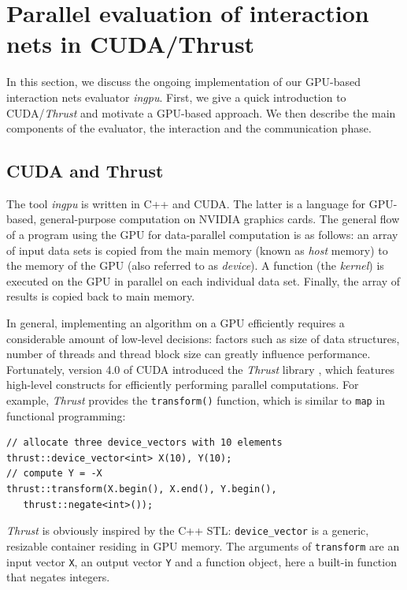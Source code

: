 \documentclass[submission,copyright,creativecommons]{eptcs}
\begin{document}

\section{Parallel evaluation of interaction nets in CUDA/Thrust}
\label{sec:parallel-evaluation-with-cuda}

In this section, we discuss the ongoing implementation of our GPU-based
interaction nets evaluator \emph{ingpu}. First, we give a quick introduction to
CUDA/\emph{Thrust} and motivate a GPU-based approach. We then describe the main
components of the evaluator, the interaction and the communication phase.

\subsection{CUDA and Thrust}
The tool \emph{ingpu} is written in C++ and CUDA. The latter is a language for
GPU-based, general-purpose
computation on NVIDIA graphics cards.
The general flow of a program using the
GPU for data-parallel computation is as follows: an array of input data sets is
copied from the main memory (known as \emph{host} memory) to the memory of the
GPU (also referred to as \emph{device}). A function (the \emph{kernel}) is
executed on the GPU in parallel on each individual data set. Finally, the array
of results is copied back to main memory.

In general, implementing an algorithm on a GPU efficiently requires
a considerable amount of low-level decisions: factors such as size of data
structures, number of threads and thread block size can greatly influence
performance. Fortunately, version 4.0 of CUDA introduced the \emph{Thrust}
library \cite{Thrust}, which features high-level constructs for efficiently
performing parallel computations. For example, \emph{Thrust} provides the
\lstinline;transform(); function, which is similar to \lstinline;map; in
functional programming:
%
%
%
\begin{lstlisting}
// allocate three device_vectors with 10 elements
thrust::device_vector<int> X(10), Y(10);
// compute Y = -X
thrust::transform(X.begin(), X.end(), Y.begin(),
   thrust::negate<int>());
\end{lstlisting}
\emph{Thrust} is obviously inspired by the C++ STL: \lstinline;device_vector; is a
generic, resizable container residing in GPU memory. The arguments of
\lstinline;transform; are an input vector \lstinline;X;, an output vector
\lstinline;Y; and a function object, here a built-in function that negates
integers.
\end{document}
